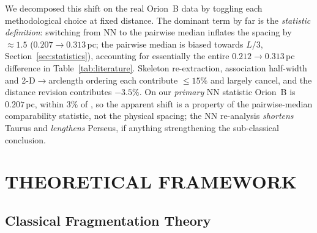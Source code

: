 \documentclass[usenatbib,twoside,twocolumn]{mnras}
\begin{document}
We decomposed this shift on the real Orion~B data by toggling each methodological choice at fixed distance. The dominant term by far is the \emph{statistic definition}: switching from NN to the pairwise median inflates the spacing by $\approx1.5$ ($0.207\to0.313$\,pc; the pairwise median is biased towards $L/3$, Section~\ref{sec:statistics}), accounting for essentially the entire $0.212\to0.313$\,pc difference in Table~\ref{tab:literature}. Skeleton re-extraction, association half-width and 2-D$\to$arclength ordering each contribute $\le15\%$ and largely cancel, and the distance revision contributes $-3.5\%$. On our \emph{primary} NN statistic Orion~B is $0.207$\,pc, within $3\%$ of \citet{Konyves2020}, so the apparent shift is a property of the pairwise-median comparability statistic, not the physical spacing; the NN re-analysis \emph{shortens} Taurus and \emph{lengthens} Perseus, if anything strengthening the sub-classical conclusion.

\section{THEORETICAL FRAMEWORK}
\label{sec:theory}

\subsection{Classical Fragmentation Theory}
\end{document}
